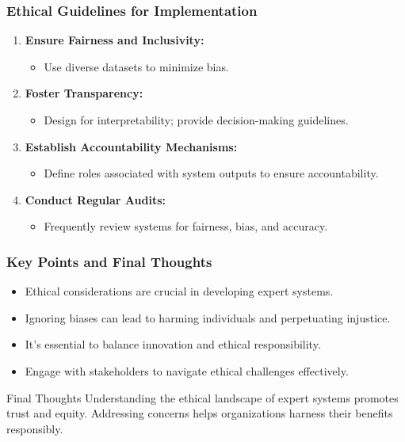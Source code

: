 \documentclass[aspectratio=169]{beamer}
\begin{document}
\begin{frame}[fragile]
    \frametitle{Ethical Guidelines for Implementation}
    \begin{enumerate}
        \item \textbf{Ensure Fairness and Inclusivity:}
        \begin{itemize}
            \item Use diverse datasets to minimize bias.
        \end{itemize}

        \item \textbf{Foster Transparency:}
        \begin{itemize}
            \item Design for interpretability; provide decision-making guidelines.
        \end{itemize}

        \item \textbf{Establish Accountability Mechanisms:}
        \begin{itemize}
            \item Define roles associated with system outputs to ensure accountability.
        \end{itemize}

        \item \textbf{Conduct Regular Audits:}
        \begin{itemize}
            \item Frequently review systems for fairness, bias, and accuracy.
        \end{itemize}
    \end{enumerate}
\end{frame}

\begin{frame}[fragile]
    \frametitle{Key Points and Final Thoughts}
    \begin{itemize}
        \item Ethical considerations are crucial in developing expert systems.
        \item Ignoring biases can lead to harming individuals and perpetuating injustice.
        \item It's essential to balance innovation and ethical responsibility.
        \item Engage with stakeholders to navigate ethical challenges effectively.
    \end{itemize}
    
    \begin{block}{Final Thoughts}
        Understanding the ethical landscape of expert systems promotes trust and equity. Addressing concerns helps organizations harness their benefits responsibly.
    \end{block}
\end{frame}
\end{document}
